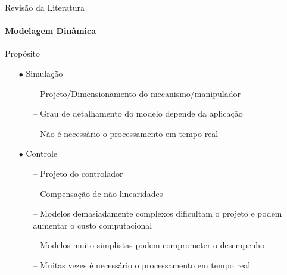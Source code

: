 \documentclass[25pt,landscape]{beamer}
\begin{document}
\begin{frame}{Revisão da Literatura}
    \framesubtitle{Modelagem Dinâmica}
        \begin{block}{Propósito}
    	\begin{itemize}
    		\item[$\bullet$] Simulação
    		\begin{itemize}
    			\item[--] Projeto/Dimensionamento do mecanismo/manipulador \\[4pt]
    			\item[--] Grau de detalhamento do modelo depende da aplicação \\[4pt]
    			\item[--] Não é necessário o processamento em tempo real \\[4pt]
    		\end{itemize}
    		\item[$\bullet$] Controle
    		\begin{itemize}
    			\item[--] Projeto do controlador \\[4pt]
    			\item[--] Compensação de não linearidades \\[4pt]
    			\item[--] Modelos demasiadamente complexos dificultam o projeto e podem aumentar o custo computacional \\[4pt]
    			\item[--] Modelos muito simplistas podem comprometer o desempenho \\[4pt]
    			\item[--] Muitas vezes é necessário o processamento em tempo real \\[4pt]
    		\end{itemize}
    	\end{itemize}
    \end{block}
\end{frame}
\end{document}
